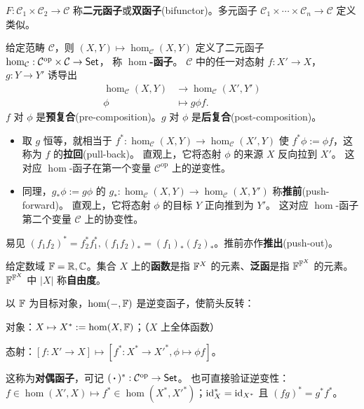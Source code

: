 \begin{definition}
	$F: \mathcal{C}_1 \times \mathcal{C}_2 \to \mathcal{C}$ 称\textbf{二元函子}或\textbf{双函子}(bifunctor)。多元函子 $\mathcal{C}_1 \times \cdots \times \mathcal{C}_n \to \mathcal{C}$ 定义类似。
\end{definition}

\begin{definition}
		给定范畴 $\mathcal{C}$，则 $(X,Y) \mapsto \hom_{\mathcal{C}}(X, Y)$ 定义了二元函子 $\hom_{\mathcal{C}}: \mathcal{C}^\mathrm{op} \times \mathcal{C}  \to \mathsf{Set}$，
	称 \textbf{$\hom$-函子}。
	$\mathcal{C}$ 中的任一对态射 $f: X' \to X$，$g: Y \to Y'$ 诱导出
	\begin{align*}
		\hom_{\mathcal{C}}(X, Y) & \longrightarrow \hom_{\mathcal{C}}(X', Y') \\
		\phi & \longmapsto g \phi f .
	\end{align*}
	$f$ 对 $\phi$ 是\textbf{预复合}(pre-composition)。$g$ 对 $\phi$ 是\textbf{后复合}(post-composition)。
	\begin{itemize}
		\item 取 $g$ 恒等，就相当于 $f^*:\hom_{\mathcal{C}}(X, Y) \to \hom_{\mathcal{C}}(X', Y)$ 使 $f^* \phi := \phi f$，这称为 $f$ 的\textbf{拉回}(pull-back)。
	直观上，它将态射 $\phi$ 的来源 $X$ 反向拉到 $X'$。
	这对应 $\hom$-函子在第一个变量 $\mathcal{C}^\mathrm{op}$ 上的逆变性。
		\item 同理，$g_* \phi := g\phi$ 的 $g_*:\hom_{\mathcal{C}}(X, Y) \to \hom_{\mathcal{C}}(X, Y')$ 称\textbf{推前}(push-forward)。
	直观上，它将态射 $\phi$ 的目标 $Y$ 正向推到为 $Y'$。 
	这对应 $\hom$-函子第二个变量 $\mathcal{C}$ 上的协变性。
	\end{itemize}
\end{definition}
\begin{remark}
	易见 $(f_1 f_2)^* = f_2^* f_1^*, (f_1 f_2)_* = (f_1)_* (f_2)_*$。推前亦作\textbf{推出}(push-out)。
\end{remark}

\begin{definition}
    给定数域 $\mathbb{F}=\mathbb{R},\mathbb{C}$。集合 $X$ 上的\textbf{函数}是指 $\mathbb{F}^X$ 的元素、\textbf{泛函}是指 $\mathbb{F}^{\mathbb{F}^X}$ 的元素。$\mathbb{F}^{\mathbb{F}^X}$ 中 $|X|$ 称\textbf{自由度}。
\end{definition}

\begin{example}
	以 $\mathbb{F}$ 为目标对象，$\hom(-, \mathbb{F})$ 是逆变函子，使箭头反转：
	\begin{compactitem}
		\item 对象：$X \mapsto X^* := \hom(X, \mathbb{F})$；（$X$ 上全体函数）
		\item 态射：$[f:X'\to X] \mapsto [f^*: X^* \to X'^*, \phi\mapsto\phi f]$。
	\end{compactitem}
	这称为\textbf{对偶函子}，可记 $(\oo)^*: \mathcal{C}^\mathrm{op}\to \cate{Set}$。
	也可直接验证逆变性：$f\in\hom(X',X) \mapsto f^*\in\hom(X^*, X'^*)$；$\mathrm{id}_X^*=\mathrm{id}_{X^*}$ 且 $(f  g)^*=g^*  f^*$。
\end{example}

